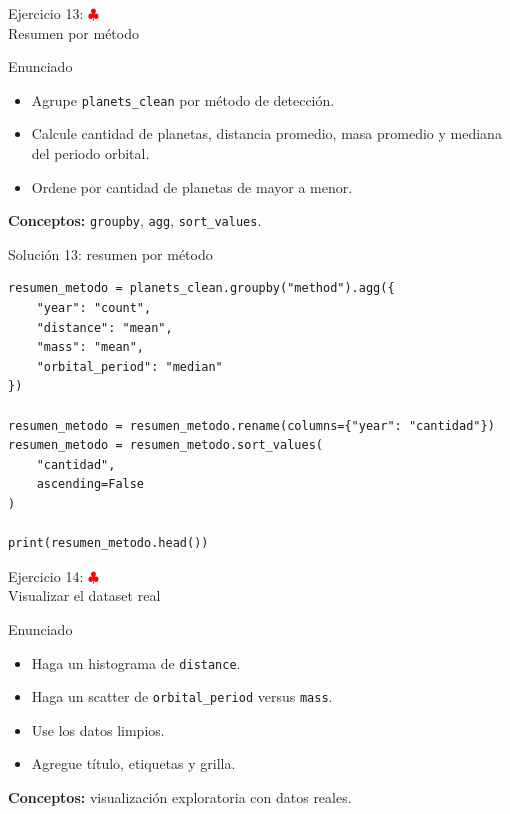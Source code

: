 \documentclass[10pt]{beamer}
\begin{document}
\begin{frame}{Ejercicio 13: \hfill \textcolor{red}{$\clubsuit$} \\ Resumen por método}
  \begin{block}{Enunciado}
    \begin{itemize}
      \item Agrupe \texttt{planets\_clean} por método de detección.
      \item Calcule cantidad de planetas, distancia promedio, masa promedio y mediana del periodo orbital.
      \item Ordene por cantidad de planetas de mayor a menor.
    \end{itemize}
  \end{block}
  \textbf{Conceptos:} \texttt{groupby}, \texttt{agg}, \texttt{sort\_values}.
\end{frame}

\begin{solutionblock}
\begin{frame}[fragile,shrink=5]{Solución 13: resumen por método}
\begin{verbatim}
resumen_metodo = planets_clean.groupby("method").agg({
    "year": "count",
    "distance": "mean",
    "mass": "mean",
    "orbital_period": "median"
})

resumen_metodo = resumen_metodo.rename(columns={"year": "cantidad"})
resumen_metodo = resumen_metodo.sort_values(
    "cantidad",
    ascending=False
)

print(resumen_metodo.head())
\end{verbatim}
\end{frame}
\end{solutionblock}

\begin{frame}{Ejercicio 14: \hfill \textcolor{red}{$\clubsuit$} \\ Visualizar el dataset real}
  \begin{block}{Enunciado}
    \begin{itemize}
      \item Haga un histograma de \texttt{distance}.
      \item Haga un scatter de \texttt{orbital\_period} versus \texttt{mass}.
      \item Use los datos limpios.
      \item Agregue título, etiquetas y grilla.
    \end{itemize}
  \end{block}
  \textbf{Conceptos:} visualización exploratoria con datos reales.
\end{frame}
\end{document}
